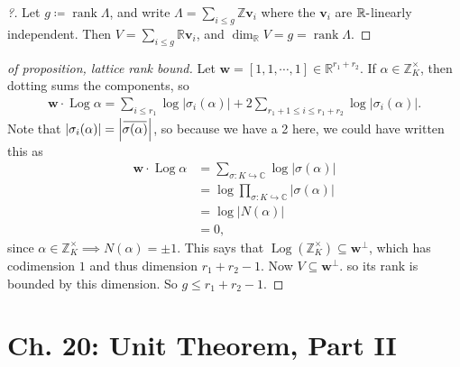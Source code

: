 \begin{proof}[?]

Let \(g\coloneqq\operatorname{rank}\Lambda\), and write
\(\Lambda= \sum_{i\leq g} {\mathbb{Z}}\mathbf{v}_i\) where the
\(\mathbf{v}_i\) are \({\mathbb{R}}{\hbox{-}}\)linearly independent.
Then \(V = \sum_{i\leq g} {\mathbb{R}}\mathbf{v}_i\), and
\(\dim_{\mathbb{R}}V = g = \operatorname{rank}\Lambda\).

\end{proof}

\begin{proof}[of proposition, lattice rank bound]

Let
\(\mathbf{w} = {\left[ {1, 1, \cdots, 1} \right]}\in {\mathbb{R}}^{r_1 + r_2}\).
If \(\alpha\in {\mathbb{Z}}_K^{\times}\), then dotting sums the
components, so
\begin{align*}
\mathbf{w} \cdot \operatorname{Log}\alpha = \sum_{i\leq r_1} \log {\left\lvert {\sigma_i( \alpha)} \right\rvert}
+ 2\sum_{r_1 + 1 \leq i \leq r_1 + r_2} \log {\left\lvert {\sigma_i( \alpha) } \right\rvert}
.\end{align*}
Note that
\({\left\lvert {\sigma_i(\alpha)} \right\rvert} = {\left\lvert {\mkern 1.5mu\overline{\mkern-1.5mu\sigma( \alpha)\mkern-1.5mu}\mkern 1.5mu} \right\rvert}\),
so because we have a 2 here, we could have written this as
\begin{align*}
\mathbf{w} \cdot \operatorname{Log}\alpha 
&= \sum_{\sigma:K\hookrightarrow{\mathbb{C}}} \log {\left\lvert {\sigma(\alpha)} \right\rvert}\\
&= \log\prod_{\sigma: K\hookrightarrow{\mathbb{C}}} {\left\lvert {\sigma( \alpha)} \right\rvert} \\
&= \log {\left\lvert { N ( \alpha)} \right\rvert} \\
&= 0
,\end{align*}
since \(\alpha\in {\mathbb{Z}}_K^{\times}\implies N( \alpha) = \pm 1\).
This says that
\(\operatorname{Log}({\mathbb{Z}}_K^{\times}) \subseteq \mathbf{w}^\perp\),
which has codimension \(1\) and thus dimension \(r_1 + r_2 - 1\). Now
\(V \subseteq \mathbf{w} ^\perp\). so its rank is bounded by this
dimension. So \(g\leq r_1 + r_2 - 1\).

\end{proof}

\hypertarget{ch.-20-unit-theorem-part-ii}{%
\section{Ch. 20: Unit Theorem, Part
II}\label{ch.-20-unit-theorem-part-ii}}

